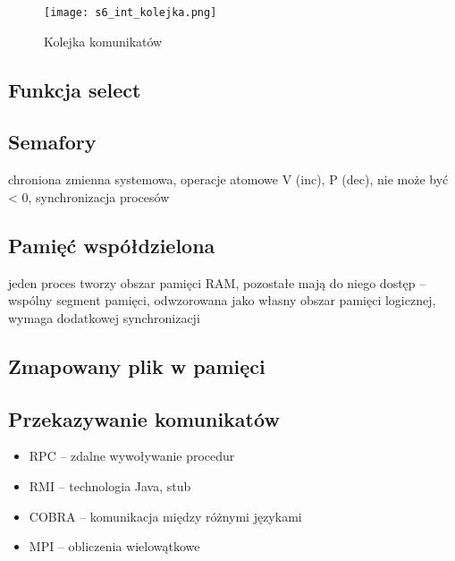 \begin{figure}[!h]
\centering
\texttt{[image: s6\_int\_kolejka.png]}
\caption{Kolejka komunikatów}
\end{figure}

\subsection{Funkcja select}

\subsection{Semafory}

chroniona zmienna systemowa, operacje atomowe V (inc), P (dec), nie może być < 0, synchronizacja procesów

\subsection{Pamięć współdzielona}

jeden proces tworzy obszar pamięci RAM, pozostałe mają do niego dostęp -- wspólny segment pamięci, odwzorowana jako własny obszar pamięci logicznej, wymaga dodatkowej synchronizacji

\subsection{Zmapowany plik w pamięci}

\subsection{Przekazywanie komunikatów}
\begin{itemize}
\item RPC -- zdalne wywoływanie procedur
\item RMI -- technologia Java, stub
\item COBRA -- komunikacja między różnymi językami
\item MPI -- obliczenia wielowątkowe
\end{itemize}